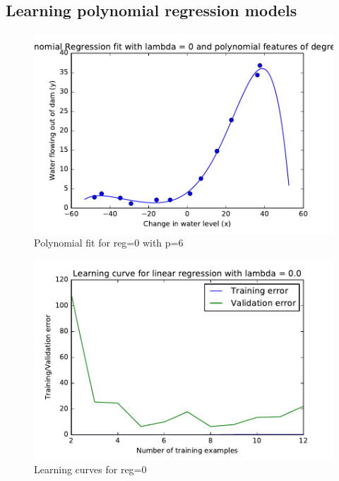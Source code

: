 \documentclass[pdftex,11pt]{article}
\begin{document}
\subsection{Learning polynomial regression models}
\begin{figure}
  \caption{Polynomial fit for reg=0 with p=6}
  \centering
    \includegraphics[scale=1]{fig9.pdf}
\end{figure}
\begin{figure}
  \caption{Learning curves for reg=0}
  \centering
    \includegraphics[scale=1]{fig10.pdf}
\end{figure}
\end{document}
